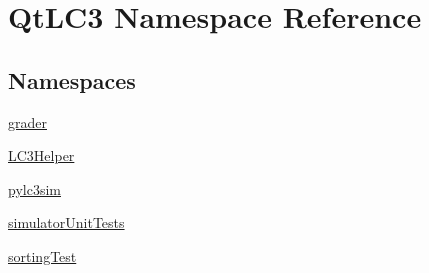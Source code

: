 \hypertarget{namespace_qt_l_c3}{\section{Qt\-L\-C3 Namespace Reference}
\label{namespace_qt_l_c3}
}
\subsection*{Namespaces}
\begin{DoxyCompactItemize}
\item 
\hyperlink{namespace_qt_l_c3_1_1grader}{grader}
\item 
\hyperlink{namespace_qt_l_c3_1_1_l_c3_helper}{L\-C3\-Helper}
\item 
\hyperlink{namespace_qt_l_c3_1_1pylc3sim}{pylc3sim}
\item 
\hyperlink{namespace_qt_l_c3_1_1simulator_unit_tests}{simulator\-Unit\-Tests}
\item 
\hyperlink{namespace_qt_l_c3_1_1sorting_test}{sorting\-Test}
\end{DoxyCompactItemize}
